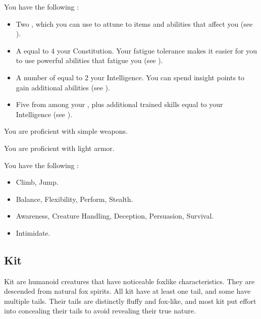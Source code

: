              You have the following :
            \begin{itemize}
                \item Two , which you can use to attune to items and abilities that affect you (see ).
                \item A  equal to 4 \add your Constitution.
                    Your fatigue tolerance makes it easier for you to use powerful abilities that fatigue you (see ).
                \item A number of  equal to 2 \add your Intelligence.
                    You can spend insight points to gain additional abilities (see ).
                \item Five  from among your , plus additional trained skills equal to your Intelligence (see ).
            \end{itemize}

            You are proficient with simple weapons.

            You are proficient with light armor.

            You have the following :
            \begin{itemize}
                \item {} Climb, Jump.
                \item {} Balance, Flexibility, Perform, Stealth.
                \item {} Awareness, Creature Handling, Deception, Persuasion, Survival.
                \item {} Intimidate.
            \end{itemize}

    \subsection{Kit}

        Kit are humanoid creatures that have noticeable foxlike characteristics.
        They are descended from natural fox spirits.
        All kit have at least one tail, and some have multiple tails.
        Their tails are distinctly fluffy and fox-like, and most kit put effort into concealing their tails to avoid revealing their true nature.

